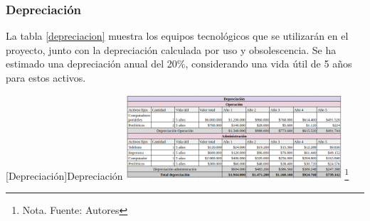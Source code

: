\subsubsection{Depreciación}

La tabla \ref{depreciacion} muestra los equipos tecnológicos que se utilizarán en el proyecto, junto con la depreciación calculada por uso y obsolescencia. Se ha estimado una depreciación anual del 20\%, considerando una vida útil de 5 años para estos activos.

\vspace{2mm}
\begin{minipage}{0.9\textwidth}
\centering
{}[Depreciación]{Depreciación}
\label{depreciacion}
\includegraphics[width=0.6\textwidth]{Content/Images/AF/amortizacion_Depresiacion.png}
\footnote{Nota. \textup{Fuente: Autores}}
\end{minipage}
